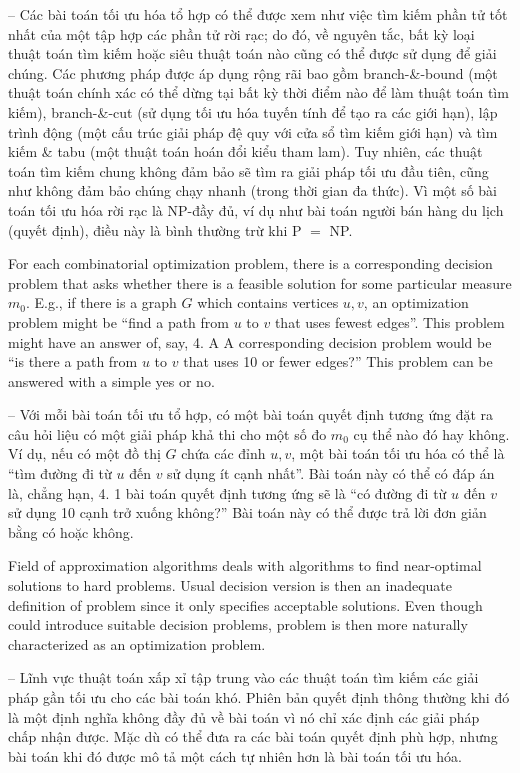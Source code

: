 \documentclass{article}
\begin{document}
-- Các bài toán tối ưu hóa tổ hợp có thể được xem như việc tìm kiếm phần tử tốt nhất của một tập hợp các phần tử rời rạc; do đó, về nguyên tắc, bất kỳ loại thuật toán tìm kiếm hoặc siêu thuật toán nào cũng có thể được sử dụng để giải chúng. Các phương pháp được áp dụng rộng rãi bao gồm branch-\&-bound (một thuật toán chính xác có thể dừng tại bất kỳ thời điểm nào để làm thuật toán tìm kiếm), branch-\&-cut (sử dụng tối ưu hóa tuyến tính để tạo ra các giới hạn), lập trình động (một cấu trúc giải pháp đệ quy với cửa sổ tìm kiếm giới hạn) và tìm kiếm \& tabu (một thuật toán hoán đổi kiểu tham lam). Tuy nhiên, các thuật toán tìm kiếm chung không đảm bảo sẽ tìm ra giải pháp tối ưu đầu tiên, cũng như không đảm bảo chúng chạy nhanh (trong thời gian đa thức). Vì một số bài toán tối ưu hóa rời rạc là NP-đầy đủ, ví dụ như bài toán người bán hàng du lịch (quyết định), điều này là bình thường trừ khi P $=$ NP.

For each combinatorial optimization problem, there is a corresponding decision problem that asks whether there is a feasible solution for some particular measure $m_0$. E.g., if there is a graph $G$ which contains vertices $u,v$, an optimization problem might be ``find a path from $u$ to $v$ that uses fewest edges''. This problem might have an answer of, say, 4. A A corresponding decision problem would be ``is there a path from $u$ to $v$ that uses 10 or fewer edges?'' This problem can be answered with a simple yes or no.

-- Với mỗi bài toán tối ưu tổ hợp, có một bài toán quyết định tương ứng đặt ra câu hỏi liệu có một giải pháp khả thi cho một số đo $m_0$ cụ thể nào đó hay không. Ví dụ, nếu có một đồ thị $G$ chứa các đỉnh $u,v$, một bài toán tối ưu hóa có thể là ``tìm đường đi từ $u$ đến $v$ sử dụng ít cạnh nhất''. Bài toán này có thể có đáp án là, chẳng hạn, 4. 1 bài toán quyết định tương ứng sẽ là ``có đường đi từ $u$ đến $v$ sử dụng 10 cạnh trở xuống không?'' Bài toán này có thể được trả lời đơn giản bằng có hoặc không.

Field of approximation algorithms deals with algorithms to find near-optimal solutions to hard problems. Usual decision version is then an inadequate definition of problem since it only specifies acceptable solutions. Even though could introduce suitable decision problems, problem is then more naturally characterized as an optimization problem.

-- Lĩnh vực thuật toán xấp xỉ tập trung vào các thuật toán tìm kiếm các giải pháp gần tối ưu cho các bài toán khó. Phiên bản quyết định thông thường khi đó là một định nghĩa không đầy đủ về bài toán vì nó chỉ xác định các giải pháp chấp nhận được. Mặc dù có thể đưa ra các bài toán quyết định phù hợp, nhưng bài toán khi đó được mô tả một cách tự nhiên hơn là bài toán tối ưu hóa.
\end{document}
